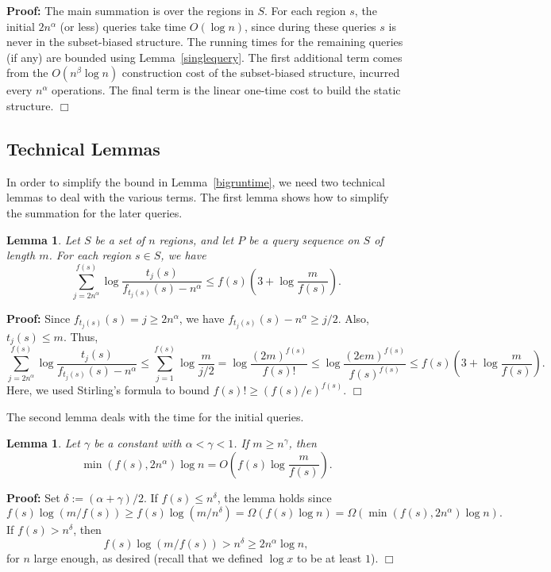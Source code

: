 \documentclass[11pt]{article}
\newtheorem{lemma}[figure]{Lemma}
\newenvironment{proof}{\noindent\textbf{Proof: }\ignorespaces}
  {\hspace*{\fill}$\Box$\medskip}
\newcommand{\eqdef}{:=}
\begin{document}
\begin{proof} 
The main summation is over the regions in $S$. For each
region $s$, the initial $2 n^\alpha$ (or less) queries take 
time $O(\log n)$, since during these queries $s$ is never in 
the subset-biased structure. The running times for the 
remaining queries (if any) are 
bounded using Lemma~\ref{singlequery}. The first additional term 
comes from the $O(n^\beta\log n)$ construction cost of the 
subset-biased structure, incurred every $n^\alpha$ operations. 
The final term is the
linear one-time cost to build the static structure.
\end{proof}

\subsection{Technical Lemmas}

In order to simplify the bound in Lemma~\ref{bigruntime}, we need
two technical lemmas to deal with the various terms. 
The first lemma shows how to simplify the summation for the later queries.

\begin{lemma} \label{longmath} 
Let $S$ be a set of $n$ regions, and let $P$ be a query sequence on
$S$ of length $m$.
For each region $s \in S$, we have
\[ 
\sum_{j=2n^\alpha}^{f(s)} \log
\frac{t_j(s)}{f_{t_j(s)}(s)-n^\alpha} \leq  f(s) \left(3 + \log
\frac{m}{f(s)}\right).
\]
\end{lemma}


\begin{proof} 
Since $f_{t_j(s)}(s) = j \geq 2n^\alpha$, we
have $f_{t_j(s)}(s) - n^\alpha  \geq j/2$. Also,  $t_j(s) \leq m$. Thus,
\[ 
\sum_{j=2n^\alpha}^{f(s)} \log
\frac{t_j(s)}{f_{t_j(s)}(s)-n^\alpha} 
\leq \sum_{{j=1}}^{f(s)}
\log \frac{{m}}{j/2} = \log \frac{(2m)^{f(s)}}{f(s)!} \leq
\log \frac{(2em)^{f(s)}}{f(s)^{f(s)}} \leq f(s) \left(3+\log 
\frac{m}{f(s)} \right).
\]
Here, we used Stirling's formula to bound
$f(s)! \geq (f(s)/e)^{f(s)}$.
\end{proof}

The second lemma deals with the time for the initial queries.

\begin{lemma} \label{smallcase} 
Let  $\gamma$ be a constant with $\alpha<\gamma<1$.
If $m \geq n^{\gamma}$, then 
\[
\min(f(s), 2 n^\alpha) \log n = 
O \left( f(s)\log \frac{m}{f(s)} \right).
\]
\end{lemma}


\begin{proof} 
Set $\delta \eqdef (\alpha + \gamma)/2$.
If $f(s) \leq n^{\delta}$, the lemma holds since 
\[
f(s)\log (m/f(s)) \geq f(s) \log(m/n^{\delta}) 
= \Omega(f(s)\log n) = \Omega(\min(f(s), 2 n^\alpha) \log n).
\]
If $f(s) > n^{\delta}$, then 
\[
f(s)\log (m/f(s)) > n^{\delta}
\geq 2n^\alpha \log n,
\]
for $n$ large enough, as desired (recall that we defined $\log x$ to be at least $1$).
\end{proof}
\end{document}
